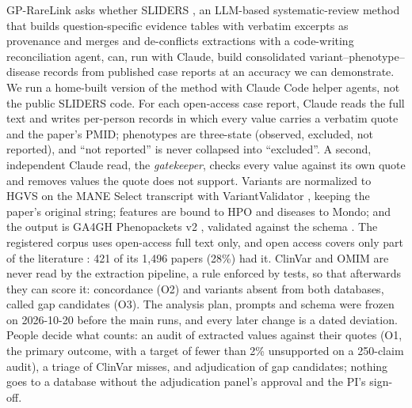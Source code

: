 \documentclass{article} %
\begin{document}
GP-RareLink asks whether SLIDERS \citep{joshi2026_sliders}, an LLM-based systematic-review method that builds question-specific evidence tables with verbatim excerpts as provenance and merges and de-conflicts extractions with a code-writing reconciliation agent, can, run with Claude, build consolidated variant--phenotype--disease records from published case reports at an accuracy we can demonstrate. We run a home-built version of the method with Claude Code helper agents, not the public SLIDERS code. For each open-access case report, Claude reads the full text and writes per-person records in which every value carries a verbatim quote and the paper's PMID; phenotypes are three-state (observed, excluded, not reported), and ``not reported'' is never collapsed into ``excluded''. A second, independent Claude read, the \emph{gatekeeper}, checks every value against its own quote and removes values the quote does not support. Variants are normalized to HGVS \citep{dendunnen2016_hgvs,hart2024_hgvs2024} on the MANE Select transcript \citep{morales2022_mane} with VariantValidator \citep{freeman2018_variantvalidator}, keeping the paper's original string; features are bound to HPO and diseases to Mondo; and the output is GA4GH Phenopackets v2 \citep{jacobsen2022_phenopacket_schema,ladewig2023_phenopackets_primer}, validated against the schema \citep{danis2023_phenopacket_tools}. The registered corpus uses open-access full text only, and open access covers only part of the literature \citep{Piwowar2018StateOa}: 421 of its 1,496 papers (28\%) had it. ClinVar and OMIM are never read by the extraction pipeline, a rule enforced by tests, so that afterwards they can score it: concordance (O2) and variants absent from both databases, called gap candidates (O3). The analysis plan, prompts and schema were frozen on 2026-10-20 before the main runs, and every later change is a dated deviation. People decide what counts: an audit of extracted values against their quotes (O1, the primary outcome, with a target of fewer than 2\% unsupported on a 250-claim audit), a triage of ClinVar misses, and adjudication of gap candidates; nothing goes to a database without the adjudication panel's approval and the PI's sign-off.
\end{document}
